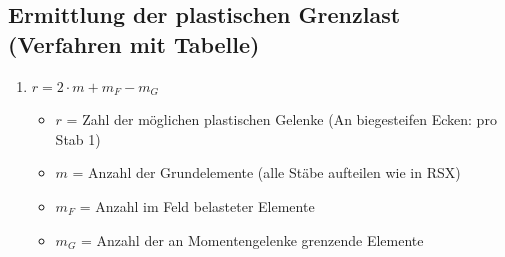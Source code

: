 \documentclass[fleqn,twoside]{article}
\begin{document}
    \subsection{Ermittlung der plastischen Grenzlast (Verfahren mit Tabelle)}
        \begin{enumerate}
            \item $r=2\cdot m +m_F - m_G$
                \begin{itemize}
                    \item $r$ = Zahl der möglichen plastischen Gelenke (An biegesteifen Ecken: pro Stab 1)
                    \item $m$ = Anzahl der Grundelemente (alle Stäbe aufteilen wie in RSX)
                    \item $m_F$ = Anzahl im Feld belasteter Elemente
                    \item $m_G$ = Anzahl der an Momentengelenke grenzende Elemente
                \end{itemize}


\end{enumerate}
\end{document}
